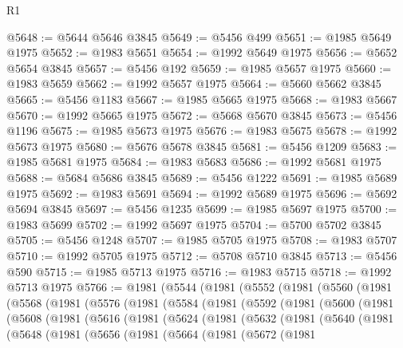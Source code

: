 \begin{lexlean}{R1}
\begin{coremodule}
@5648 := @5644 @5646 @3845
@5649 := @5456 @499
@5651 := @1985 @5649 @1975
@5652 := @1983 @5651
@5654 := @1992 @5649 @1975
@5656 := @5652 @5654 @3845
@5657 := @5456 @192
@5659 := @1985 @5657 @1975
@5660 := @1983 @5659
@5662 := @1992 @5657 @1975
@5664 := @5660 @5662 @3845
@5665 := @5456 @1183
@5667 := @1985 @5665 @1975
@5668 := @1983 @5667
@5670 := @1992 @5665 @1975
@5672 := @5668 @5670 @3845
@5673 := @5456 @1196
@5675 := @1985 @5673 @1975
@5676 := @1983 @5675
@5678 := @1992 @5673 @1975
@5680 := @5676 @5678 @3845
@5681 := @5456 @1209
@5683 := @1985 @5681 @1975
@5684 := @1983 @5683
@5686 := @1992 @5681 @1975
@5688 := @5684 @5686 @3845
@5689 := @5456 @1222
@5691 := @1985 @5689 @1975
@5692 := @1983 @5691
@5694 := @1992 @5689 @1975
@5696 := @5692 @5694 @3845
@5697 := @5456 @1235
@5699 := @1985 @5697 @1975
@5700 := @1983 @5699
@5702 := @1992 @5697 @1975
@5704 := @5700 @5702 @3845
@5705 := @5456 @1248
@5707 := @1985 @5705 @1975
@5708 := @1983 @5707
@5710 := @1992 @5705 @1975
@5712 := @5708 @5710 @3845
@5713 := @5456 @590
@5715 := @1985 @5713 @1975
@5716 := @1983 @5715
@5718 := @1992 @5713 @1975
@5766 := @1981
    (@5544
      (@1981
        (@5552
          (@1981
            (@5560
              (@1981
                (@5568
                  (@1981
                    (@5576
                      (@1981
                        (@5584
                          (@1981
                            (@5592
                              (@1981
                                (@5600
                                  (@1981
                                    (@5608
                                      (@1981
                                        (@5616
                                          (@1981
                                            (@5624
                                              (@1981
                                                (@5632
                                                  (@1981
                                                    (@5640
                                                      (@1981
                                                        (@5648
                                                          (@1981
                                                            (@5656
                                                              (@1981
                                                                (@5664
                                                                  (@1981
                                                                    (@5672
                                                                      (@1981

\end{coremodule}
\end{lexlean}
